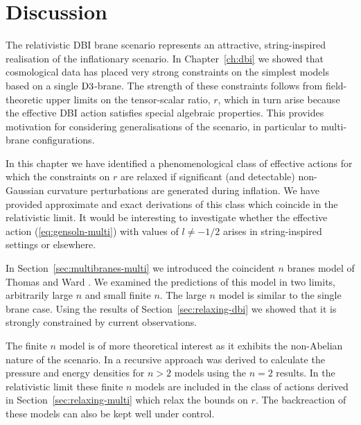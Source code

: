 % 
% 
% 
\section{Discussion}
\label{sec:disc-multi}


The relativistic DBI brane scenario represents an attractive, 
string-inspired realisation of the inflationary scenario. In
Chapter~\ref{ch:dbi} we showed that
cosmological data has placed very strong constraints on the simplest 
models based on a single ${\rm D3}$-brane. The strength 
of these constraints follows from field-theoretic upper limits 
on the tensor-scalar ratio, $r$, which in turn arise because 
the effective DBI action satisfies special  
algebraic properties. This provides motivation 
for considering generalisations of the scenario, in particular to 
multi-brane configurations. 


In this chapter we have identified a phenomenological class of 
effective actions for which the constraints 
on $r$ are relaxed if significant (and detectable) 
non-Gaussian curvature perturbations are generated during inflation. 
We have provided approximate and exact derivations of this class which coincide
in the relativistic limit. It would be interesting to 
investigate whether the effective action (\ref{eq:gensoln-multi}) with values
of $l \ne - 1/2$ arises in string-inspired settings or elsewhere.

In Section~\ref{sec:multibranes-multi} we introduced the coincident $n$ branes
model of Thomas and Ward \cite{thomasward}. We examined the predictions of this
model in two limits, arbitrarily large $n$ and small finite $n$. The large $n$
model
is similar to the single brane case. Using the results of
Section~\ref{sec:relaxing-dbi} we showed that it is strongly
constrained by current observations.

The finite $n$ model is of more theoretical interest as it exhibits the
non-Abelian nature of the scenario. In  a recursive approach was
derived to calculate the pressure and energy densities for $n>2$ models using
the $n=2$ results. In the relativistic limit these finite $n$ models are
included in the class of actions derived in Section~\ref{sec:relaxing-multi}
which relax the bounds on $r$. The backreaction of these models can also be
kept well under control.

